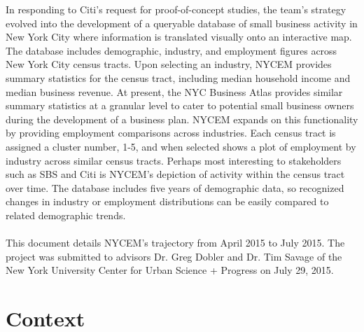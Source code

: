 \documentclass[article, 11pt]{article} %
\begin{document}
In responding to Citi's request for proof-of-concept studies, the team's strategy evolved into the development of a queryable database of small business activity in New York City where information is translated visually onto an interactive map. The database includes demographic, industry, and employment figures across New York City census tracts. Upon selecting an industry, NYCEM provides summary statistics for the census tract, including median household income and median business revenue. At present, the NYC Business Atlas provides similar summary statistics at a granular level to cater to potential small business owners during the development of a business plan. NYCEM expands on this functionality by providing employment comparisons across industries. Each census tract is assigned a cluster number, 1-5, and when selected shows a plot of employment by industry across similar census tracts. Perhaps most interesting to stakeholders such as SBS and Citi is NYCEM's depiction of activity within the census tract over time. The database includes five years of demographic data, so recognized changes in industry or employment distributions can be easily compared to related demographic trends.
\\\\
This document details NYCEM's trajectory from April 2015 to July 2015. The project was submitted to advisors Dr. Greg Dobler and Dr. Tim Savage of the New York University Center for Urban Science + Progress on July 29, 2015.

\section*{Context}
\end{document}
